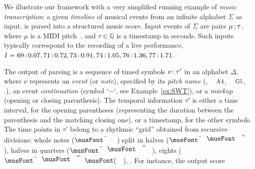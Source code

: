 \begin{example}%
\label{ex:running}
We illustrate our framework with a very simplified %
running example of \emph{music transcription}:
a given \emph{timeline} of musical events
from an infinite alphabet $\Sigma$ as input,
is parsed into a structured music score.
Input events of $\Sigma$
are pairs $\mu \mathop{:}{\tau}$, where $\mu$ is a
MIDI pitch~\cite{Selfridge-Field97beyondMIDI}, %
and $\tau \in \mathbb{Q}$ is a timestamp in seconds.
Such inputs typically correspond
to the recording of a live performance, \eg
$I = 69\mathop{:}{0.07},
     71\mathop{:}{0.72},
     73\mathop{:}{0.91},
     74\mathop{:}{1.05},
     76\mathop{:}{1.36},
     77\mathop{:}{1.71}$. %

The output of parsing is a sequence of
timed symbols $\nu\mathop{:}{\tau'}$ in an alphabet $\Delta$,
where $\nu$  represents
an \emph{event} (or \emph{note}),
specified by its \emph{pitch name}
(\eg, $\mbox{\footnotesize A4}$, $\mbox{\footnotesize G5}$, \etc.),
an event \emph{continuation} (symbol `$-$`, see Example~\ref{ex:SWT}),
or a \emph{markup} (opening or closing parenthesis). %
The temporal information $\tau'$ 
is either a time interval, for the opening parentheses
(representing the duration between the parenthesis 
 and the matching closing one), 
or a timestamp, for the other symbols.
The time points in $\tau'$ belong to a rhythmic ``grid'' obtained from recursive divisions:
whole notes ($\musWhole$) split in halves ($\musHalf$), halves
in quarters ($\musQuarter$), eights ($\musEighth$), \etc.
%
For instance, the output score

\end{example}
